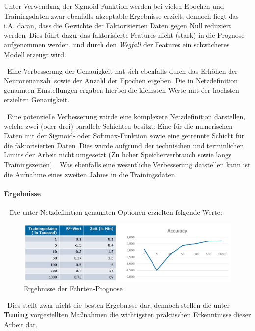 Unter Verwendung der Sigmoid-Funktion werden bei vielen Epochen und Trainingsdaten zwar ebenfalls akzeptable Ergebnisse erzielt, dennoch liegt das i.A. daran, dass die Gewichte der Faktorisierten Daten gegen Null reduziert werden. Dies führt dazu, das faktorisierte Features nicht (stark) in die Prognose aufgenommen werden, und durch den \textit{Wegfall} der Features ein schwächeres Modell erzeugt wird. 

~\newline Eine Verbesserung der Genauigkeit hat sich ebenfalls durch das Erhöhen der Neuronenanzahl sowie der Anzahl der Epochen ergeben. Die in Netzdefinition genannten Einstellungen ergaben hierbei die kleinsten Werte mit der höchsten erzielten Genauigkeit.

~\newline Eine potenzielle Verbesserung würde eine komplexere Netzdefinition darstellen, welche zwei (oder drei) parallele Schichten besitzt: Eine für die numerischen Daten mit der Sigmoid- oder Softmax-Funktion sowie eine getrennte Schicht für die faktorisierten Daten. Dies wurde aufgrund der technischen und terminlichen Limits der Arbeit nicht umgesetzt (Zu hoher Speicherverbrauch sowie lange Trainingszeiten). 
~\newline Was ebenfalls eine wesentliche Verbesserung darstellen kann ist die Aufnahme eines zweiten Jahres in die Trainingsdaten. ~\newpage
\paragraph{Ergebnisse} ~\newline
Die unter Netzdefinition genannten Optionen erzielten folgende Werte:

\begin{figure}[h]
	\begin{center}
		\includegraphics[width=0.95\linewidth]{Bilder/FahrtenErgebnisse}
		\caption[Ergebnisse der Trinkgeldprognose]{Ergebnisse der Fahrten-Prognose}
		\label{fig:RidesErg}
	\end{center}
\end{figure}

~\newline Dies stellt zwar nicht die besten Ergebnisse dar, dennoch stellen die unter \textbf{Tuning} vorgestellten Maßnahmen die wichtigsten praktischen Erkenntnisse dieser Arbeit dar. 

